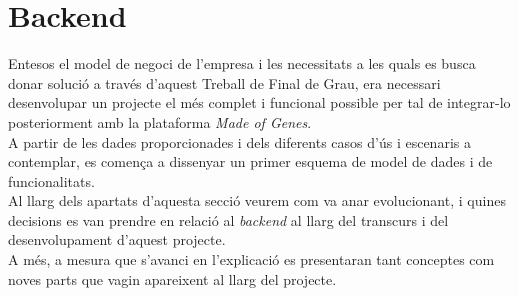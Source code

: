 \section{Backend}
\label{backend_dev}
Entesos el model de negoci de l'empresa i les necessitats a les quals es busca donar solució a través d'aquest Treball de Final de Grau, era necessari desenvolupar un projecte el més complet i funcional possible per tal de integrar-lo posteriorment amb la plataforma \textit{Made of Genes}.\\
A partir de les dades proporcionades i dels diferents casos d'ús i escenaris a contemplar, es comença a dissenyar un primer esquema de model de dades i de funcionalitats.\\
\newline Al llarg dels apartats d'aquesta secció veurem com va anar evolucionant, i quines decisions es van prendre en relació al \textit{backend} al llarg del transcurs i del desenvolupament d'aquest projecte.\\
\newline A més, a mesura que s'avanci en l'explicació es presentaran tant conceptes com noves parts que vagin apareixent al llarg del projecte.

